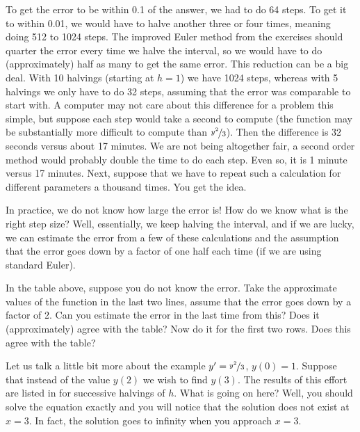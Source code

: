 To get the error to be within 0.1 of the answer, we had to
do 64 steps.  To get it to within 0.01, we would have to halve another three or
four times, meaning doing 512 to 1024 steps.
The improved Euler method from the exercises
should quarter the
error every time we halve the interval,
so we would have to do (approximately) half as many
 to get the same error.  This reduction can be a big deal.  With 10
halvings (starting at $h=1$) we have 1024 steps, whereas with 5 halvings
we only have to do 32 steps, assuming that the error was comparable to start
with.  A computer may not care about this
difference for a problem this simple, but suppose each step would take a
second to compute (the function may be substantially more difficult to compute
than $\nicefrac{y^2}{3}$).  Then the difference is 32 seconds versus about 17 minutes.
We are not being altogether fair, a second order method would probably
double the time to do each step.  Even so, it is 1 minute versus 17 minutes.
Next, suppose that we have to repeat such a calculation for different
parameters a thousand times.  You get the idea.

In practice, we do not know how large the error is!
How do we know what is
the right step size?  Well, essentially, we keep halving the interval, and if we
are lucky, we can estimate the error from a few of these calculations and the
assumption that the error goes down by a factor of one half each time (if
we are using standard Euler).

\begin{exercise}
In the table above, suppose you do not know the error.  Take
the approximate values of the function in the last two lines,
assume that the error goes down by a factor of 2.  Can you estimate the
error in the last time from this?  Does it (approximately) agree with the
table?  Now do it for the first two rows.  Does this agree with the table?
\end{exercise}

Let us talk a little bit more about the example
$y' = \nicefrac{y^2}{3}$, $y(0) =
1$.  Suppose that instead of the value $y(2)$ we wish to find $y(3)$.
The results of this effort are listed in
 for successive halvings of $h$.  What is
going on here?  Well, you should solve the equation exactly and you will
notice that the solution does not exist at $x=3$.  In fact, the solution goes
to infinity when you approach $x=3$.

